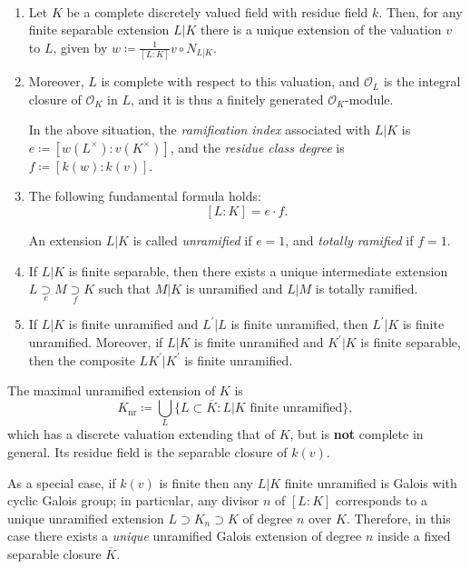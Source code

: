 \documentclass{article}
\begin{document}
\begin{facts}\
		\begin{enumerate}
				\item Let $K$ be a complete discretely valued field with residue field $k$. Then, for any finite separable extension $L|K$ there is a unique extension of the valuation $v$ to $L$, given by $w \coloneqq \frac{1}{[L:K]}v\circ N_{L|K}$.
				\item Moreover, $L$ is complete with respect to this valuation, and $\mathcal{O}_L$ is the integral closure of $\mathcal{O}_K$ in $L$, and it is thus a finitely generated $\mathcal{O}_K$-module. 
				\begin{defn}
		In the above situation, the \emph{ramification index} associated with $L|K$ is $e\coloneqq [w(L^\times):v(K^\times)]$, and the \emph{residue class degree} is $f\coloneqq [k(w):k(v)]$.
\end{defn}
\item The following fundamental formula holds:
\[
	[L:K] = e\cdot f.
\]
\begin{defn}
		An extension $L|K$ is called \emph{unramified} if $e=1$, and \emph{totally ramified} if $f=1$.
\end{defn}
\item		If $L|K$ is finite separable, then there exists a unique intermediate extension $L\underset{e}{\supset} M\underset{f}{\supset} K$ such that $M|K$ is unramified and $L|M$ is totally ramified.
\item If $L|K$ is finite unramified and $L^\prime|L$ is finite unramified, then $L^\prime|K$ is finite unramified. Moreover, if $L|K$ is finite unramified and $K^\prime|K$ is finite separable, then the composite $LK^\prime|K^\prime$ is finite unramified.
		\end{enumerate}
\end{facts}
\begin{defn}
		The maximal unramified extension of $K$ is 
		\[
			K_\text{nr} \coloneqq \bigcup_L \{L\subset \overline{K}: L|K \text{ finite unramified}\},
		\]
		which has a discrete valuation extending that of $K$, but is \textbf{not} complete in general. Its residue field is the separable closure of $k(v)$.
\end{defn}
As a special case, if $k(v)$ is finite then any $L|K$ finite unramified is Galois with cyclic Galois group; in particular, any divisor $n$ of $[L:K]$ corresponds to a unique unramified extension $L\supset K_n\supset K$ of degree $n$ over $K$. Therefore, in this case there exists a \textit{unique} unramified Galois extension of degree $n$ inside a fixed separable closure $\overline{K}$.
\end{document}

